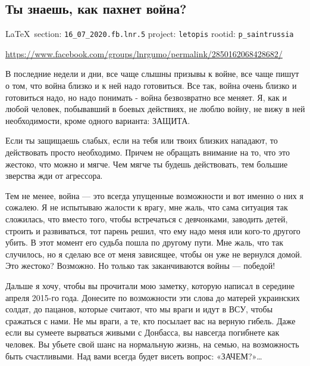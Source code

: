  
 
  
\subsection{Ты знаешь, как пахнет война?}
\vspace{0.5cm}
{\ifDEBUG\small\LaTeX~section: \verb|16_07_2020.fb.lnr.5| project: \verb|letopis| rootid: \verb|p_saintrussia|\fi}
\vspace{0.5cm}
  
\url{https://www.facebook.com/groups/lnrgumo/permalink/2850162068428682/}

В последние недели и дни, все чаще слышны призывы к войне, все чаще пишут о
том, что война близко и к ней надо готовиться. Все так, война очень близко и
готовиться надо, но надо понимать - война безвозвратно все меняет. Я, как и
любой человек, побывавший в боевых действиях, не люблю войну, не вижу в ней
необходимости, кроме одного варианта: ЗАЩИТА.

Если ты защищаешь слабых, если на тебя или твоих близких нападают, то
действовать просто необходимо. Причем не обращать внимание на то, что это
жестоко, что можно и мягче. Чем мягче ты будешь действовать, тем большие
зверства жди от агрессора.

Тем не менее, война --- это всегда упущенные возможности и вот именно о них я
сожалею. Я не испытываю жалости к врагу, мне жаль, что сама ситуация так
сложилась, что вместо того, чтобы встречаться с девчонками, заводить детей,
строить и развиваться, тот парень решил, что ему надо меня или кого-то другого
убить. В этот момент его судьба пошла по другому пути. Мне жаль, что так
случилось, но я сделаю все от меня зависящее, чтобы он уже не вернулся домой.
Это жестоко? Возможно. Но только так заканчиваются войны --- победой!

Дальше я хочу, чтобы вы прочитали мою заметку, которую написал в середине
апреля 2015-го года. Донесите по возможности эти слова до матерей украинских
солдат, до пацанов, которые считают, что мы враги и идут в ВСУ, чтобы сражаться
с нами. Не мы враги, а те, кто посылает вас на верную гибель. Даже если вы
сумеете вырваться живыми с Донбасса, вы навсегда погибнете как человек. Вы
убьете свой шанс на нормальную жизнь, на семью, на возможность быть
счастливыми. Над вами всегда будет висеть вопрос: «ЗАЧЕМ?»…


